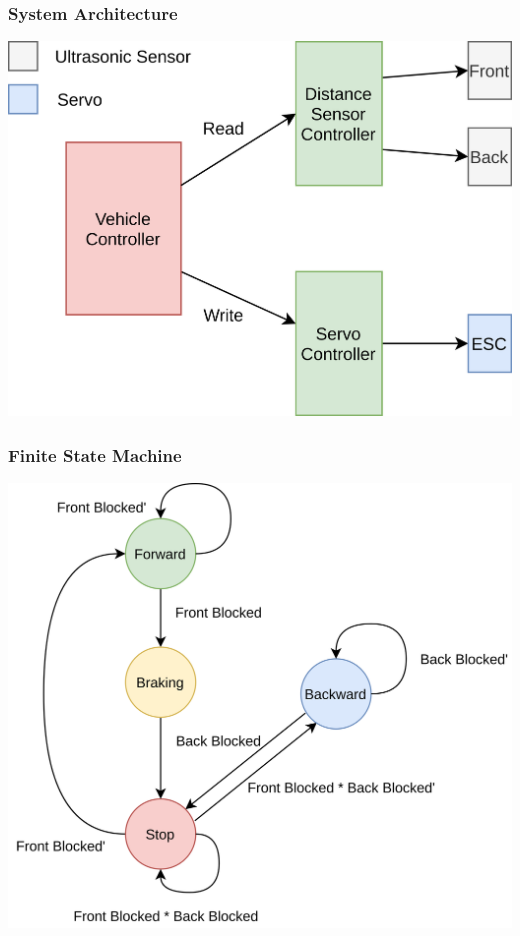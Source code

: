 \documentclass{beamer}
\begin{document}
\begin{frame}
    \frametitle{System Architecture}
    \includegraphics[width=\linewidth]{img/system-architecture.png}
\end{frame}

\begin{frame}
    \frametitle{Finite State Machine}
    \centering
    \includegraphics[scale=0.06, keepaspectratio]{img/finite-state-machine.png}
\end{frame}
\end{document}

